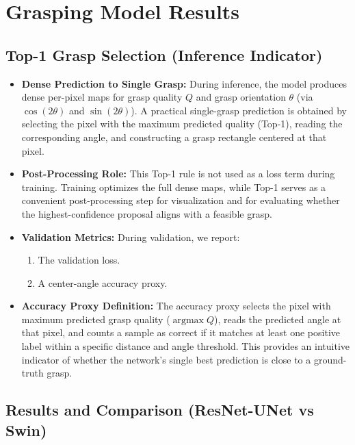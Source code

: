 \section{Grasping Model Results}

\subsection{Top-1 Grasp Selection (Inference Indicator)}
\begin{itemize}
    \item \textbf{Dense Prediction to Single Grasp:} During inference, the model produces dense per-pixel maps for grasp quality $Q$ and grasp orientation $\theta$ (via $\cos(2\theta)$ and $\sin(2\theta)$). A practical single-grasp prediction is obtained by selecting the pixel with the maximum predicted quality (Top-1), reading the corresponding angle, and constructing a grasp rectangle centered at that pixel.
    
    \item \textbf{Post-Processing Role:} This Top-1 rule is not used as a loss term during training. Training optimizes the full dense maps, while Top-1 serves as a convenient post-processing step for visualization and for evaluating whether the highest-confidence proposal aligns with a feasible grasp.
    
    \item \textbf{Validation Metrics:} During validation, we report:
    \begin{enumerate}
        \item The validation loss.
        \item A center-angle accuracy proxy.
    \end{enumerate}    
    \item \textbf{Accuracy Proxy Definition:} The accuracy proxy selects the pixel with maximum predicted grasp quality ($\operatorname{argmax} Q$), reads the predicted angle at that pixel, and counts a sample as correct if it matches at least one positive label within a specific distance and angle threshold. This provides an intuitive indicator of whether the network's single best prediction is close to a ground-truth grasp.
\end{itemize}

\subsection{Results and Comparison (ResNet-UNet vs Swin)}

